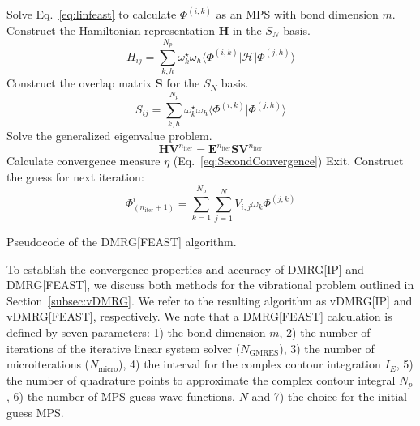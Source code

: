 \documentclass[journal=jctcce]{achemso}
\begin{document}
\begin{algorithm}[htbp!]
  \begin{algorithmic}[1]
                \State Solve Eq.~\ref{eq:linfeast} to calculate $\Phi^{(i,k)}$ as an MPS with bond dimension $m$.
            \EndFor
        \EndFor
        \State Construct the Hamiltonian representation $\bm{H}$ in the $S_N$ basis.
        \begin{equation*}
            H_{ij} = \sum_{k,h}^{N_p} \omega_k^\star \omega_h \langle \Phi^{(i,k)} | \mathcal{H} | \Phi^{(j,h)} \rangle
        \end{equation*}
        \State Construct the overlap matrix $\bm{S}$ for the $S_N$ basis.
        \begin{equation*}
            S_{ij} = \sum_{k,h}^{N_p} \omega_k^\star \omega_h \langle \Phi^{(i,k)} | \Phi^{(j,h)} \rangle
        \end{equation*}
        \State Solve the generalized eigenvalue problem.
        \begin{equation*}
            \bm{H} \bm{V}^{n_\text{iter}} = \bm{E}^{n_\text{iter}} \bm{S} \bm{V}^{n_\text{iter}}
        \end{equation*}
        \State Calculate convergence measure $\eta$ (Eq.~\ref{eq:SecondConvergence})
            \State Exit.
        \Else
            \State Construct the guess for next iteration:
                \State
                \begin{equation*}
                    \Phi_{(n_\text{iter}+1)}^{i} 
                        = \sum_{k=1}^{N_\text{p}} \sum_{j=1}^{N} V_{i,j} \omega_k \Phi^{(j,k)}
                \end{equation*}
            \EndFor
        \EndIf
      \EndFor
    \EndProcedure
  \end{algorithmic}
  \caption{Pseudocode of the DMRG[FEAST] algorithm.}
  \label{alg:DMRG_FEAST}
\end{algorithm}
%
\noindent To establish the convergence properties and accuracy of DMRG[IP] and DMRG[FEAST], we discuss both methods for the vibrational problem outlined in Section~\ref{subsec:vDMRG}. We refer to the resulting algorithm as vDMRG[IP] and vDMRG[FEAST], respectively. We note that a  DMRG[FEAST] calculation is defined by seven parameters: 1) the bond dimension $m$, 2) the number of iterations of the iterative linear system solver ($N_\text{GMRES}$), 3) the number of microiterations ($N_\text{micro}$), 4) the interval for the complex contour integration $I_E$, 5) the number of quadrature points to approximate the complex contour integral $N_p$,  6) the number of MPS guess wave functions, $N$ and 7) the choice for the initial guess MPS.
\end{document}
